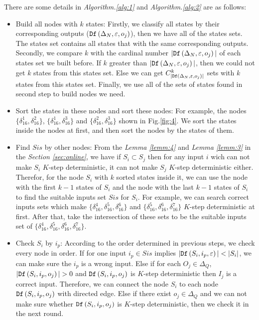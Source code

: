 There are some details in {\em Algorithm.\ref{alg:1}} and {\em Algorithm.\ref{alg:2}} are as follows:
\begin{itemize}
\item Build all nodes with $k$ states: Firstly, we classify all states by their corresponding outputs (${\tt Df}\left(\Delta_N,\varepsilon,o_j\right)$), then we have all of the states sets. The states set contains all states that with the same corresponding outputs. Secondly, we compare $k$ with the cardinal number $|{\tt Df}\left(\Delta_N,\varepsilon,o_j\right)|$ of each states set we built before. If $k$ greater than $|{\tt Df}\left(\Delta_N,\varepsilon,o_j\right)|$, then we could not get $k$ states from this states set. Else we can get $C_{|{\tt Df}\left(\Delta_N,\varepsilon,o_j\right)|}^k$ sets with $k$ states from this states set. Finally, we use all of the sets of states found in second step to build nodes we need. 
 \item Sort the states in these nodes and sort these nodes: For example, the nodes $\{\delta_{16}^1,\delta_{16}^2\}$, $\{\delta_{16}^1,\delta_{16}^3\}$ and $\{\delta_{16}^2,\delta_{16}^3\}$ shown in Fig.\ref{fig:4}. We sort the states inside the nodes at first, and then sort the nodes by the states of them.
  \item Find $Sis$ by other nodes: From the {\em Lemma \ref{lemm:4}} and {\em Lemma \ref{lemm:3}} in the {\em Section \ref{sec:online}}, we have if $S_i\subset S_j$ then for any input $i$ wich can not make $S_i$ $K$-step deterministic, it can not make $S_j$ $K$-step deterministic either. Therefor, for the node $S_i$ with $k$ sorted states inside it, we can use the node with the first $k-1$ states of $S_i$ and the node with the last $k-1$ states of $S_i$ to find the suitable inputs set $Sis$ for $S_i$. For example, we can search correct inputs sets which make $\{\delta_{16}^4,\delta_{16}^5,\delta_{16}^6\}$ and $\{\delta_{16}^5,\delta_{16}^6,\delta_{16}^7\}$ $K$-step deterministic at first. After that, take the intersection of these sets to be the suitable inputs set of $\{\delta_{16}^4,\delta_{16}^5,\delta_{16}^6,\delta_{16}^7\}$. 
  \item Check $S_i$ by $i_p$: According to the order determined in previous steps, we check every node in order. If for one input $i_p\in Sis$ implies $|\Ded\left(S_i,i_p,\varepsilon\right)|<|S_i|$, we can make sure the $i_p$ is a wrong input. Else if for each $O_j \in \Delta_Q$, $|\Ded\left(S_i,i_p,o_j\right)|>0$ and ${\tt Df}\left(S_i,i_p,o_j\right)$ is $K$-step deterministic then $I_j$ is a correct input. Therefore, we can connect the node $S_i$ to each node ${\tt Df}\left(S_i,i_p,o_j\right)$ with directed edge. Else if there exist $o_j \in \Delta_Q$ and we can not make sure whether ${\tt Df}\left(S_i,i_p,o_j\right)$ is $K$-step deterministic, then we check it in the next round. 
\end{itemize} 

